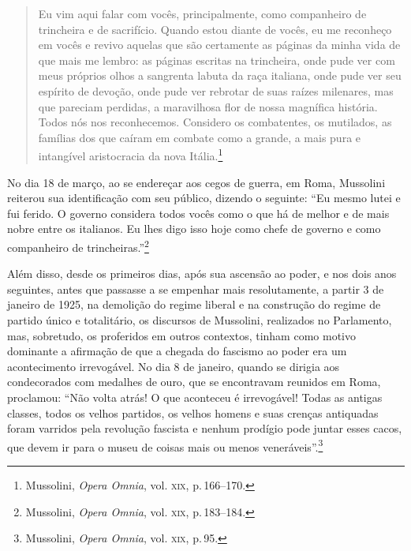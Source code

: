 \begin{quote}
Eu vim aqui falar com vocês, principalmente, como companheiro de
trincheira e de sacrifício. Quando estou diante de vocês, eu me
reconheço em vocês e revivo aquelas que são certamente as páginas da
minha vida de que mais me lembro: as páginas escritas na trincheira,
onde pude ver com meus próprios olhos a sangrenta labuta da raça
italiana, onde pude ver seu espírito de devoção, onde pude ver rebrotar
de suas raízes milenares, mas que pareciam perdidas, a maravilhosa flor
de nossa magnífica história. Todos nós nos reconhecemos. Considero os
combatentes, os mutilados, as famílias dos que caíram em combate como a
grande, a mais pura e intangível aristocracia da nova Itália.\footnote{Mussolini,
  \emph{Opera Omnia}, vol. \textsc{xix}, p.\,166--170.}
\end{quote}

No dia 18 de março, ao se endereçar aos cegos de guerra, em Roma,
Mussolini reiterou sua identificação com seu público, dizendo o
seguinte: ``Eu mesmo lutei e fui ferido. O governo considera todos vocês
como o que há de melhor e de mais nobre entre os italianos. Eu lhes digo
isso hoje como chefe de governo e como companheiro de
trincheiras.''\footnote{Mussolini, \emph{Opera Omnia}, vol. \textsc{xix}, p.\,183--184.}

Além disso, desde os primeiros dias, após sua ascensão ao poder, e nos
dois anos seguintes, antes que passasse a se empenhar mais
resolutamente, a partir 3 de janeiro de 1925, na demolição do regime
liberal e na construção do regime de partido único e totalitário, os
discursos de Mussolini, realizados no Parlamento, mas, sobretudo, os
proferidos em outros contextos, tinham como motivo dominante a afirmação
de que a chegada do fascismo ao poder era um acontecimento irrevogável.
No dia 8 de janeiro, quando se dirigia aos condecorados com medalhes de
ouro, que se encontravam reunidos em Roma, proclamou: ``Não volta atrás!
O que aconteceu é irrevogável! Todas as antigas classes, todos os velhos
partidos, os velhos homens e suas crenças antiquadas foram varridos pela
revolução fascista e nenhum prodígio pode juntar esses cacos, que devem
ir para o museu de coisas mais ou menos veneráveis''.\footnote{Mussolini,
  \emph{Opera Omnia}, vol. \textsc{xix}, p.\,95.}

